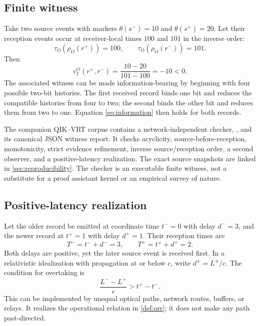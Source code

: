 \documentclass[11pt]{article}
\theoremstyle{remark}
\begin{document}
\subsection{Finite witness}

Take two source events with markers $\theta(s^-)=10$ and
$\theta(s^+)=20$. Let their reception events occur at receiver-local times
$100$ and $101$ in the inverse order:
\begin{equation}
  \tau_O(\rho_O(r^+))=100,\qquad
  \tau_O(\rho_O(r^-))=101.
\end{equation}
Then
\begin{equation}
  v_I^O(r^+,r^-)=\frac{10-20}{101-100}=-10<0.
\end{equation}
The associated witness can be made information-bearing by beginning with four
possible two-bit histories. The first received record binds one bit and
reduces the compatible histories from four to two; the second binds the other
bit and reduces them from two to one. Equation \cref{eq:information} then
holds for both records.

The companion QIK--VRT corpus contains a network-independent checker,
, and its canonical
JSON witness report. It checks acyclicity, source-before-reception,
monotonicity, strict evidence refinement, inverse source/reception order, a
second observer, and a positive-latency realization. The exact source
snapshots are linked in \cref{sec:reproducibility}. The checker is an
executable finite witness, not a substitute for a proof assistant kernel or an
empirical survey of nature.

\subsection{Positive-latency realization}

Let the older record be emitted at coordinate time $t^-=0$ with delay
$d^-=3$, and the newer record at $t^+=1$ with delay $d^+=1$. Their reception
times are
\begin{equation}
  T^-=t^-+d^-=3,\qquad T^+=t^++d^+=2.
\end{equation}
Both delays are positive, yet the later source event is received first. In a
relativistic idealization with propagation at or below $c$, write
$d^\pm=L^\pm/c$. The condition for overtaking is
\begin{equation}
  \frac{L^- - L^+}{c}>t^+-t^-.
  \label{eq:latencycondition}
\end{equation}
This can be implemented by unequal optical paths, network routes, buffers, or
relays. It realizes the operational relation in \cref{def:orr}; it does not
make any path past-directed.
\end{document}
